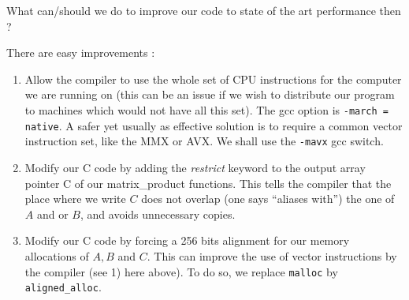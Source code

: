 \documentclass[12pt]{article}
\theoremstyle{plain}
\theoremstyle{remark}
\begin{document}
What can/should we do to improve our code to state of the art performance then ?

There are easy improvements :
\begin{enumerate}
\item Allow the compiler to use the whole set of CPU instructions for the computer
we are running on (this can be an issue if we wish to distribute our program to
machines which would not have all this set). The gcc option is {\tt -march =
native}. A safer yet usually as effective solution is to require a common vector
instruction set, like the MMX or AVX. We shall use the {\tt -mavx} gcc switch.
\item Modify our C code by adding the {\it restrict} keyword to the output array
pointer C of our matrix\_product functions. This tells the compiler that the place where
we write $C$ does not overlap (one says ``aliases with'') the one of $A$ and or
$B$, and avoids unnecessary copies. 
\item Modify our C code by forcing a 256 bits alignment for our
memory allocations of $A, B$ and $C$. This can improve the use of vector
instructions by the compiler (see 1) here above). To do so, we replace 
{\tt malloc} by {\tt aligned\_alloc}.
\end{enumerate}
\end{document}
